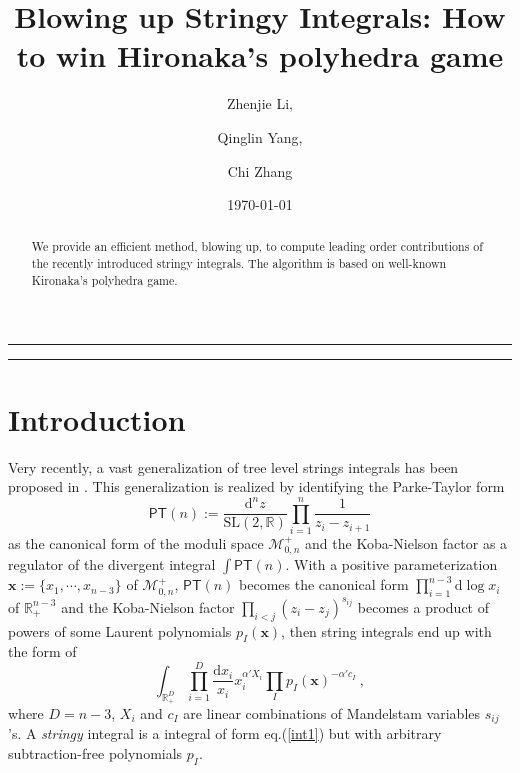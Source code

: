 \documentclass[12pt]{article}
\date{\today}
\title{Blowing up Stringy Integrals: How to win Hironaka's polyhedra game}
\author{Zhenjie Li,\and Qinglin Yang,\and Chi Zhang}
\theoremstyle{definition}
\theoremstyle{plain}
\newcommand{\dif}{\mathrm{d}} %
\begin{document}
\maketitle

\begin{abstract}
	We provide an efficient method, blowing up, to compute leading order contributions of the recently introduced stringy integrals. The algorithm is based on well-known Kironaka's polyhedra game.
\end{abstract}
\newpage

\begin{center}
	\rule{1.0\textwidth}{1pt}
\end{center}
\tableofcontents

\bigskip
\begin{center}
	\rule{1.0\textwidth}{1pt}
\end{center}


\section{Introduction}

Very recently, a vast generalization of tree level strings integrals has been proposed in \cite{Arkani-Hamed:2019mrd}. This generalization is realized by identifying the Parke-Taylor form 
\[
	\mathsf{PT}(n):=\frac{\dif^{n}z}{\mathrm{SL}(2,\mathds{R})} \prod_{i=1}^{n}\frac{1}{z_{i}-z_{i+1}}
\]
as the canonical form of the moduli space $\mathcal{M}_{0,n}^{+}$ and the Koba-Nielson factor as a regulator of the divergent integral $\int \mathsf{PT}(n)$. With a positive parameterization  $\mathbf{x}:= \{x_{1},\cdots, x_{n-3}\}$  of $\mathcal{M}_{0,n}^{+}$, $\mathsf{PT}(n)$ becomes the canonical form $\prod_{i=1}^{n-3} \dif \log x_{i}$ of $\mathds{R}_{+}^{n-3}$ and the Koba-Nielson factor $\prod_{i<j} (z_{i}-z_{j})^{s_{ij}}$ becomes a product of powers of some Laurent polynomials $p_{I}(\mathbf{x})$, then string integrals end up with the form of
\begin{equation} 
	\int_{\mathds{R}_{+}^{D}} \prod_{i=1}^{D}\frac{\dif x_{i}}{x_{i}}x_{i}^{\alpha' X_{i}}\prod_{I}p_{I}(\mathbf{x})^{-\alpha'c_{I}}	\:, \label{int1}
\end{equation}
where $D=n{-}3$, $X_{i}$ and $c_{I}$ are linear combinations of Mandelstam variables $s_{ij}$'s. A \emph{stringy} integral is a integral of form eq.(\ref{int1}) but with arbitrary subtraction-free polynomials $p_{I}$. 
\end{document}
